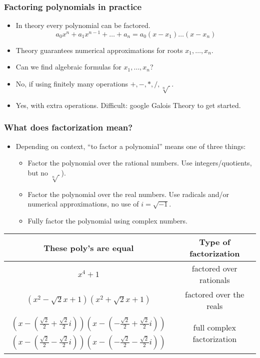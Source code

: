 \begin{frame}
\frametitle{Factoring polynomials in practice}
\begin{itemize}
\item In theory every polynomial can be factored.
\[a_0 x^{n}+a_1x^{n-1}+\dots + a_n=a_0 (x-x_1)\dots (x-x_n)
\]
\item Theory guarantees numerical approximations for roots $x_1,\dots, x_n$. 
\item Can we find algebraic formulas for $x_1, \dots, x_n$?
\item No, if using finitely many operations $+,-,*,/,\sqrt[n]{~}$. 
\item \footnotesize{ Yes, with extra operations. Difficult: google Galois Theory to get started.}
\end{itemize}
\end{frame}
\begin{frame}
\frametitle{What does factorization mean?}
\begin{itemize}
\item Depending on context, ``to factor a polynomial'' means one of three things:
\begin{itemize}
\item  Factor the polynomial over the rational numbers. Use integers/quotients, but no $\sqrt[n]{~}$).
\item Factor the polynomial over the real numbers. Use radicals and/or numerical approximations, no use of $i=\sqrt{-1}$.
\item Fully factor the polynomial using complex numbers.
\end{itemize}
\end{itemize}
\begin{tabular}{|c|c|}\hline
These poly's are equal&Type of factorization\\\hline
$x^4+1$& factored over rationals\\\hline
$(x^2-\sqrt{2}x+1)(x^2+\sqrt{2}x+1)$& factored over the reals\\\hline
$\begin{array}{r}
\left(x-\left(\frac{\sqrt{2}}{2}+\frac{\sqrt{2}}{2}i\right)\right)
\left(x-\left(-\frac{\sqrt{2}}{2}+\frac{\sqrt{2}}{2}i\right)\right)\\
\left(x-\left(\frac{\sqrt{2}}{2}-\frac{\sqrt{2}}{2}i\right)\right)
\left(x-\left(-\frac{\sqrt{2}}{2}-\frac{\sqrt{2}}{2}i\right)\right)
\end{array}$& full complex factorization\\\hline
\end{tabular}


\end{frame}